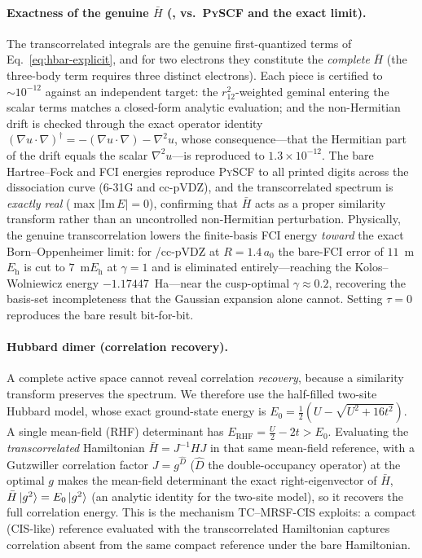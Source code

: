 \documentclass[aps,prb,reprint,superscriptaddress,floatfix]{revtex4-2}
\newcommand{\Hbar}{\bar{H}}
\newcommand{\op}[1]{\hat{#1}}
\begin{document}
\paragraph{Exactness of the genuine $\Hbar$ (, vs.\ \textsc{PySCF} and the
exact limit).}
The transcorrelated integrals are the genuine first-quantized terms of
Eq.~\eqref{eq:hbar-explicit}, and for two electrons they constitute the
\emph{complete} $\Hbar$ (the three-body term requires three distinct electrons).
Each piece is certified to $\sim\!10^{-12}$ against an independent target: the
$r_{12}^2$-weighted geminal entering the scalar terms matches a closed-form
analytic evaluation; and the non-Hermitian drift is checked through the exact
operator identity $(\nabla u\!\cdot\!\nabla)^{\dagger}=-(\nabla u\!\cdot\!\nabla)
-\nabla^2 u$, whose consequence---that the Hermitian part of the drift equals the
scalar $\nabla^2 u$---is reproduced to $1.3\times10^{-12}$. The bare Hartree--Fock
and FCI energies reproduce \textsc{PySCF} to all printed digits across the
dissociation curve (6-31G and cc-pVDZ), and the transcorrelated spectrum is
\emph{exactly real} ($\max|\mathrm{Im}\,E|=0$), confirming that $\Hbar$ acts as a
proper similarity transform rather than an uncontrolled non-Hermitian perturbation.
Physically, the genuine transcorrelation lowers the finite-basis FCI energy
\emph{toward} the exact Born--Oppenheimer limit: for /cc-pVDZ at
$R=1.4\,a_0$ the bare-FCI error of $11$~m$E_\mathrm{h}$ is cut to $7$~m$E_\mathrm{h}$
at $\gamma=1$ and is eliminated entirely---reaching the Kolos--Wolniewicz energy
$-1.17447$~Ha---near the cusp-optimal $\gamma\!\approx\!0.2$, recovering the
basis-set incompleteness that the Gaussian expansion alone cannot. Setting
$\tau=0$ reproduces the bare result bit-for-bit.

\paragraph{Hubbard dimer (correlation recovery).}
A complete active space cannot reveal correlation \emph{recovery}, because a
similarity transform preserves the spectrum. We therefore use the half-filled
two-site Hubbard model, whose exact ground-state energy is
$E_0=\tfrac12\!\left(U-\sqrt{U^2+16t^2}\right)$. A single mean-field (RHF)
determinant has $E_{\mathrm{RHF}}=\tfrac{U}{2}-2t>E_0$. Evaluating the
\emph{transcorrelated} Hamiltonian $\Hbar=J^{-1}HJ$ in that same mean-field
reference, with a Gutzwiller correlation factor $J=g^{\op{D}}$
($\op{D}$ the double-occupancy operator) at the optimal $g$ makes the mean-field
determinant the exact right-eigenvector of $\Hbar$, $\Hbar\ket{g^2}=E_0\ket{g^2}$
(an analytic identity for the two-site model), so it recovers the full correlation
energy. This is the mechanism TC--MRSF-CIS exploits: a compact (CIS-like) reference
evaluated with the transcorrelated Hamiltonian captures correlation absent from
the same compact reference under the bare Hamiltonian.
\end{document}
